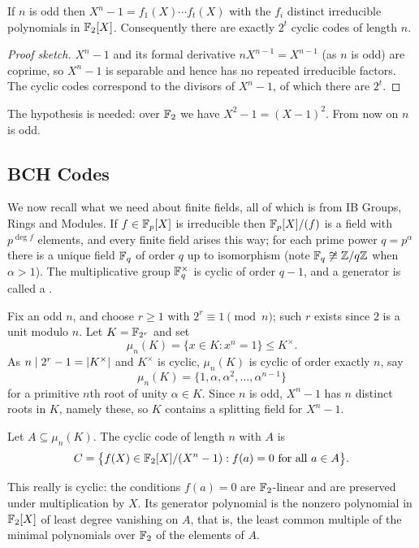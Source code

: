 \documentclass[a4paper]{scrartcl}
\begin{document}
\begin{lemma}\label{lem:squarefree}
	If $n$ is odd then $X^n-1 = f_1(X)\cdots f_t(X)$ with the $f_i$ distinct irreducible polynomials in $\mathbb{F}_2[X]$. Consequently there are exactly $2^t$ cyclic codes of length $n$.
\end{lemma}

\begin{proof}[Proof sketch]
	$X^n-1$ and its formal derivative $nX^{n-1} = X^{n-1}$ (as $n$ is odd) are coprime, so $X^n-1$ is separable and hence has no repeated irreducible factors. The cyclic codes correspond to the divisors of $X^n-1$, of which there are $2^t$.
\end{proof}

The hypothesis is needed: over $\mathbb{F}_2$ we have $X^2-1 = (X-1)^2$. From now on $n$ is odd.

\subsection{BCH Codes}

We now recall what we need about finite fields, all of which is from IB Groups, Rings and Modules. If $f \in \mathbb{F}_p[X]$ is irreducible then $\mathbb{F}_p[X]/(f)$ is a field with $p^{\deg f}$ elements, and every finite field arises this way; for each prime power $q = p^\alpha$ there is a unique field $\mathbb{F}_q$ of order $q$ up to isomorphism (note $\mathbb{F}_q \not\cong \mathbb{Z}/q\mathbb{Z}$ when $\alpha>1$). The multiplicative group $\mathbb{F}_q^\times$ is cyclic of order $q-1$, and a generator is called a .

Fix an odd $n$, and choose $r \ge 1$ with $2^r \equiv 1 \pmod n$; such $r$ exists since $2$ is a unit modulo $n$. Let $K = \mathbb{F}_{2^r}$ and set
$$\mu_n(K) = \{x \in K : x^n = 1\} \le K^\times.$$
As $n \mid 2^r-1 = \lvert K^\times\rvert$ and $K^\times$ is cyclic, $\mu_n(K)$ is cyclic of order exactly $n$, say
$$\mu_n(K) = \{1,\alpha,\alpha^2,\dots,\alpha^{n-1}\}$$
for a primitive $n$th root of unity $\alpha \in K$. Since $n$ is odd, $X^n-1$ has $n$ distinct roots in $K$, namely these, so $K$ contains a splitting field for $X^n-1$.

\begin{definition}
	Let $A \subseteq \mu_n(K)$. The cyclic code of length $n$ with  $A$ is
	$$C = \bigl\{f(X) \in \mathbb{F}_2[X]/(X^n-1) : f(a) = 0 \text{ for all } a \in A\bigr\}.$$
\end{definition}

This really is cyclic: the conditions $f(a)=0$ are $\mathbb{F}_2$-linear and are preserved under multiplication by $X$. Its generator polynomial is the nonzero polynomial in $\mathbb{F}_2[X]$ of least degree vanishing on $A$, that is, the least common multiple of the minimal polynomials over $\mathbb{F}_2$ of the elements of $A$.
\end{document}
